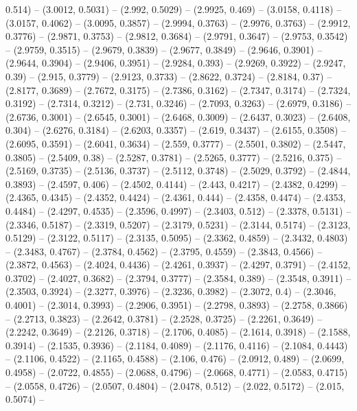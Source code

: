 {  0.514) -- (3.0012, 0.5031) -- (2.992, 0.5029) -- (2.9925, 0.469) -- (3.0158, 
  0.4118) -- (3.0157, 0.4062) -- (3.0095, 0.3857) -- (2.9994, 0.3763) -- 
  (2.9976, 0.3763) -- (2.9912, 0.3776) -- (2.9871, 0.3753) -- (2.9812, 0.3684) 
  -- (2.9791, 0.3647) -- (2.9753, 0.3542) -- (2.9759, 0.3515) -- (2.9679, 
  0.3839) -- (2.9677, 0.3849) -- (2.9646, 0.3901) -- (2.9644, 0.3904) -- 
  (2.9406, 0.3951) -- (2.9284, 0.393) -- (2.9269, 0.3922) -- (2.9247, 0.39) -- 
  (2.915, 0.3779) -- (2.9123, 0.3733) -- (2.8622, 0.3724) -- (2.8184, 0.37) -- 
  (2.8177, 0.3689) -- (2.7672, 0.3175) -- (2.7386, 0.3162) -- (2.7347, 0.3174) 
  -- (2.7324, 0.3192) -- (2.7314, 0.3212) -- (2.731, 0.3246) -- (2.7093, 0.3263)
   -- (2.6979, 0.3186) -- (2.6736, 0.3001) -- (2.6545, 0.3001) -- (2.6468, 
  0.3009) -- (2.6437, 0.3023) -- (2.6408, 0.304) -- (2.6276, 0.3184) -- (2.6203,
   0.3357) -- (2.619, 0.3437) -- (2.6155, 0.3508) -- (2.6095, 0.3591) -- 
  (2.6041, 0.3634) -- (2.559, 0.3777) -- (2.5501, 0.3802) -- (2.5447, 0.3805) --
   (2.5409, 0.38) -- (2.5287, 0.3781) -- (2.5265, 0.3777) -- (2.5216, 0.375) -- 
  (2.5169, 0.3735) -- (2.5136, 0.3737) -- (2.5112, 0.3748) -- (2.5029, 0.3792) 
  -- (2.4844, 0.3893) -- (2.4597, 0.406) -- (2.4502, 0.4144) -- (2.443, 0.4217) 
  -- (2.4382, 0.4299) -- (2.4365, 0.4345) -- (2.4352, 0.4424) -- (2.4361, 0.444)
   -- (2.4358, 0.4474) -- (2.4353, 0.4484) -- (2.4297, 0.4535) -- (2.3596, 
  0.4997) -- (2.3403, 0.512) -- (2.3378, 0.5131) -- (2.3346, 0.5187) -- (2.3319,
   0.5207) -- (2.3179, 0.5231) -- (2.3144, 0.5174) -- (2.3123, 0.5129) -- 
  (2.3122, 0.5117) -- (2.3135, 0.5095) -- (2.3362, 0.4859) -- (2.3432, 0.4803) 
  -- (2.3483, 0.4767) -- (2.3784, 0.4562) -- (2.3795, 0.4559) -- (2.3843, 
  0.4566) -- (2.3872, 0.4563) -- (2.4024, 0.4436) -- (2.4261, 0.3937) -- 
  (2.4297, 0.3791) -- (2.4152, 0.3702) -- (2.4027, 0.3682) -- (2.3794, 0.3777) 
  -- (2.3584, 0.389) -- (2.3548, 0.3911) -- (2.3503, 0.3924) -- (2.3277, 0.3976)
   -- (2.3236, 0.3982) -- (2.3072, 0.4) -- (2.3046, 0.4001) -- (2.3014, 0.3993) 
  -- (2.2906, 0.3951) -- (2.2798, 0.3893) -- (2.2758, 0.3866) -- (2.2713, 
  0.3823) -- (2.2642, 0.3781) -- (2.2528, 0.3725) -- (2.2261, 0.3649) -- 
  (2.2242, 0.3649) -- (2.2126, 0.3718) -- (2.1706, 0.4085) -- (2.1614, 0.3918) 
  -- (2.1588, 0.3914) -- (2.1535, 0.3936) -- (2.1184, 0.4089) -- (2.1176, 
  0.4116) -- (2.1084, 0.4443) -- (2.1106, 0.4522) -- (2.1165, 0.4588) -- (2.106,
   0.476) -- (2.0912, 0.489) -- (2.0699, 0.4958) -- (2.0722, 0.4855) -- (2.0688,
   0.4796) -- (2.0668, 0.4771) -- (2.0583, 0.4715) -- (2.0558, 0.4726) -- 
  (2.0507, 0.4804) -- (2.0478, 0.512) -- (2.022, 0.5172) -- (2.015, 0.5074) -- 
}
